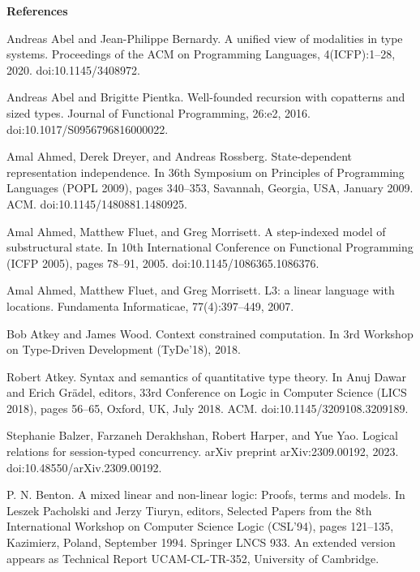 
 
\par\medskip\noindent\textbf{References}\par
  
\par\noindent  [1]  Andreas Abel and Jean-Philippe Bernardy.  A unified view of modalities in type systems.  Proceedings of the ACM on Programming Languages, 4(ICFP):1–28, 2020.  doi:10.1145/3408972.  
 
\par\noindent  [2]  Andreas Abel and Brigitte Pientka.  Well-founded recursion with copatterns and sized types.  Journal of Functional Programming, 26:e2, 2016.  doi:10.1017/S0956796816000022.  
 
\par\noindent  [3]  Amal Ahmed, Derek Dreyer, and Andreas Rossberg.  State-dependent representation independence.  In 36th Symposium on Principles of Programming Languages (POPL 2009), pages 340–353, Savannah, Georgia, USA, January 2009. ACM.  doi:10.1145/1480881.1480925.  
 
\par\noindent  [4]  Amal Ahmed, Matthew Fluet, and Greg Morrisett.  A step-indexed model of substructural state.  In 10th International Conference on Functional Programming (ICFP 2005), pages 78–91, 2005.  doi:10.1145/1086365.1086376.  
 
\par\noindent  [5]  Amal Ahmed, Matthew Fluet, and Greg Morrisett.  L3: a linear language with locations.  Fundamenta Informaticae, 77(4):397–449, 2007.  
 
\par\noindent  [6]  Bob Atkey and James Wood.  Context constrained computation.  In 3rd Workshop on Type-Driven Development (TyDe’18), 2018.  
 
\par\noindent  [7]  Robert Atkey.  Syntax and semantics of quantitative type theory.  In Anuj Dawar and Erich Grädel, editors, 33rd Conference on Logic in Computer Science (LICS 2018), pages 56–65, Oxford, UK, July 2018. ACM.  doi:10.1145/3209108.3209189.  
 
\par\noindent  [8]  Stephanie Balzer, Farzaneh Derakhshan, Robert Harper, and Yue Yao.  Logical relations for session-typed concurrency.  arXiv preprint arXiv:2309.00192, 2023.  doi:10.48550/arXiv.2309.00192.  
 
\par\noindent  [9]  P. N. Benton.  A mixed linear and non-linear logic: Proofs, terms and models.  In Leszek Pacholski and Jerzy Tiuryn, editors, Selected Papers from the 8th International Workshop on Computer Science Logic (CSL’94), pages 121–135, Kazimierz, Poland, September 1994. Springer LNCS 933.  An extended version appears as Technical Report UCAM-CL-TR-352, University of Cambridge.  
 
